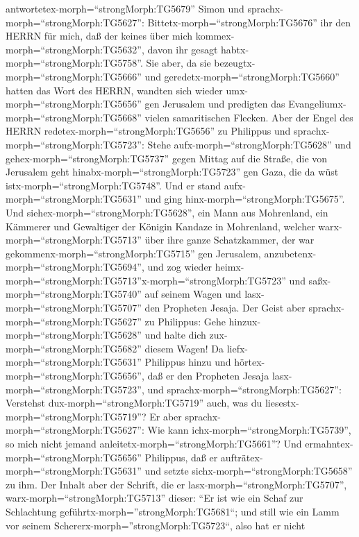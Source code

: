 antwortetex-morph=``strongMorph:TG5679'' Simon und
sprachx-morph=``strongMorph:TG5627'':
Bittetx-morph=``strongMorph:TG5676'' ihr den HERRN für mich, daß der
keines über mich kommex-morph=``strongMorph:TG5632'', davon ihr gesagt
habtx-morph=``strongMorph:TG5758''.  Sie aber, da sie
bezeugtx-morph=``strongMorph:TG5666'' und
geredetx-morph=``strongMorph:TG5660'' hatten das Wort des HERRN, wandten
sich wieder umx-morph=``strongMorph:TG5656'' gen Jerusalem und predigten
das Evangeliumx-morph=``strongMorph:TG5668'' vielen samaritischen
Flecken.  Aber der Engel des HERRN
redetex-morph=``strongMorph:TG5656'' zu Philippus und
sprachx-morph=``strongMorph:TG5723'': Stehe
aufx-morph=``strongMorph:TG5628'' und gehex-morph=``strongMorph:TG5737''
gegen Mittag auf die Straße, die von Jerusalem geht
hinabx-morph=``strongMorph:TG5723'' gen Gaza, die da wüst
istx-morph=``strongMorph:TG5748''.  Und er stand
aufx-morph=``strongMorph:TG5631'' und ging
hinx-morph=``strongMorph:TG5675''. Und
siehex-morph=``strongMorph:TG5628'', ein Mann aus Mohrenland, ein
Kämmerer und Gewaltiger der Königin Kandaze in Mohrenland, welcher
warx-morph=``strongMorph:TG5713'' über ihre ganze Schatzkammer, der war
gekommenx-morph=``strongMorph:TG5715'' gen Jerusalem,
anzubetenx-morph=``strongMorph:TG5694'',  und zog wieder
heimx-morph=``strongMorph:TG5713''x-morph=``strongMorph:TG5723'' und
saßx-morph=``strongMorph:TG5740'' auf seinem Wagen und
lasx-morph=``strongMorph:TG5707'' den Propheten Jesaja. 
Der Geist aber sprachx-morph=``strongMorph:TG5627'' zu Philippus: Gehe
hinzux-morph=``strongMorph:TG5628'' und halte dich
zux-morph=``strongMorph:TG5682'' diesem Wagen!  Da
liefx-morph=``strongMorph:TG5631'' Philippus hinzu und
hörtex-morph=``strongMorph:TG5656'', daß er den Propheten Jesaja
lasx-morph=``strongMorph:TG5723'', und
sprachx-morph=``strongMorph:TG5627'': Verstehst
dux-morph=``strongMorph:TG5719'' auch, was du
liesestx-morph=``strongMorph:TG5719''?  Er aber
sprachx-morph=``strongMorph:TG5627'': Wie kann
ichx-morph=``strongMorph:TG5739'', so mich nicht jemand
anleitetx-morph=``strongMorph:TG5661''? Und
ermahntex-morph=``strongMorph:TG5656'' Philippus, daß er
aufträtex-morph=``strongMorph:TG5631'' und setzte
sichx-morph=``strongMorph:TG5658'' zu ihm.  Der Inhalt aber
der Schrift, die er lasx-morph=``strongMorph:TG5707'',
warx-morph=``strongMorph:TG5713'' dieser: ``Er ist wie ein Schaf zur
Schlachtung geführtx-morph=''strongMorph:TG5681``; und still wie ein
Lamm vor seinem Schererx-morph=''strongMorph:TG5723``, also hat er nicht
